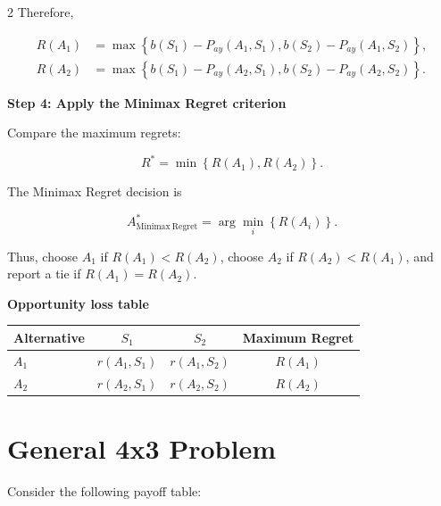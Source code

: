 \begin{multicols}{2}
		Therefore,
		
		\[
		\begin{aligned}
			R(A_1)
			&=
			\max
			\left\{
			b(S_1)-P_{ay}(A_1,S_1),
			b(S_2)-P_{ay}(A_1,S_2)
			\right\},
			\\
			R(A_2)
			&=
			\max
			\left\{
			b(S_1)-P_{ay}(A_2,S_1),
			b(S_2)-P_{ay}(A_2,S_2)
			\right\}.
		\end{aligned}
		\]
		
		\textbf{Step 4: Apply the Minimax Regret criterion}
		
		Compare the maximum regrets:
		
		\[
		R^*
		=
		\min
		\left\{
		R(A_1),R(A_2)
		\right\}.
		\]
		
		The Minimax Regret decision is
		
		\[
		A^*_{\mathrm{Minimax\ Regret}}
		=
		\arg\min_i
		\left\{
		R(A_i)
		\right\}.
		\]
		
		Thus, choose $A_1$ if $R(A_1)<R(A_2)$, choose $A_2$ if
		$R(A_2)<R(A_1)$, and report a tie if $R(A_1)=R(A_2)$.
		
		\textbf{Opportunity loss table}
		
		\begin{center}
			\small
			\renewcommand{\arraystretch}{1.5}
			\setlength{\tabcolsep}{5pt}
			
			\begin{tabular}{lcc|c}
				\toprule
				Alternative & $S_1$ & $S_2$ & Maximum Regret \\
				\midrule
				
				$A_1$
				&
				$r(A_1,S_1)$
				&
				$r(A_1,S_2)$
				&
				$R(A_1)$
				\\
				
				$A_2$
				&
				$r(A_2,S_1)$
				&
				$r(A_2,S_2)$
				&
				$R(A_2)$
				\\
				
				\bottomrule
			\end{tabular}
		\end{center}
		
	\end{multicols}
	
	\setlength{\columnseprule}{0pt}
	
	
	
	\section{General 4x3 Problem}
	
		Consider the following payoff table:
		
